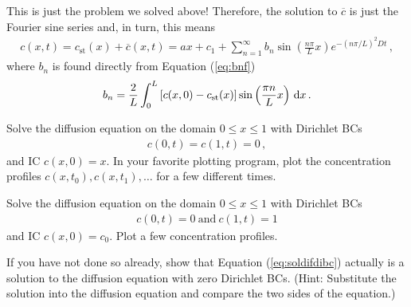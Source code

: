 This is just the problem we solved above! Therefore, the solution to $\overline{c}$ is 
just the Fourier sine series and, in turn, this means
\begin{eqnarray}
	c(x,t) = c_\text{st}(x) + \overline{c}(x,t)=ax+c_1 + \sum_{n=1}^\infty b_n
	\sin\left(\frac{n\pi}{L}x\right) e^{-(n\pi/L)^2 Dt} \, ,
\end{eqnarray}
where $b_n$ is found directly from Equation (\ref{eq:bnf}) 
\begin{eqnarray}
	b_n = \frac{2}{L} \int_0^L \left[ c(x,0) - c_\text{st}(x) \right] \sin\left( \frac{\pi n}{L} x \right) \, \mathrm{d} x \, .
\end{eqnarray}

\begin{exerciseregion}

	\begin{exercise}
		Solve the diffusion equation on the domain $0 \leq x \leq 1$ with Dirichlet BCs 
		\begin{eqnarray}
			c(0,t)=c(1,t)=0 \, ,
		\end{eqnarray}
		and IC $c(x,0)=x$. In your favorite plotting program, 
		plot the concentration profiles $c(x,t_0), c(x,t_1), \ldots$ for a few different 
		times. 
	\end{exercise}	

	\begin{exercise}
		Solve the diffusion equation on the domain $0 \leq x \leq 1$ with Dirichlet BCs
		\begin{eqnarray}
			c(0,t)=0 \ \text{and} \ c(1,t)=1
		\end{eqnarray}
		and IC $c(x, 0)= c_0.$ Plot a few concentration profiles.
	\end{exercise}

	\begin{exercise}
		If you have not done so already, show that Equation (\ref{eq:soldifdibc})
		actually is a solution to the diffusion equation
		with zero Dirichlet BCs. (Hint: Substitute the solution into the
		diffusion equation and compare the two sides of the equation.)
	\end{exercise}


\end{exerciseregion}
